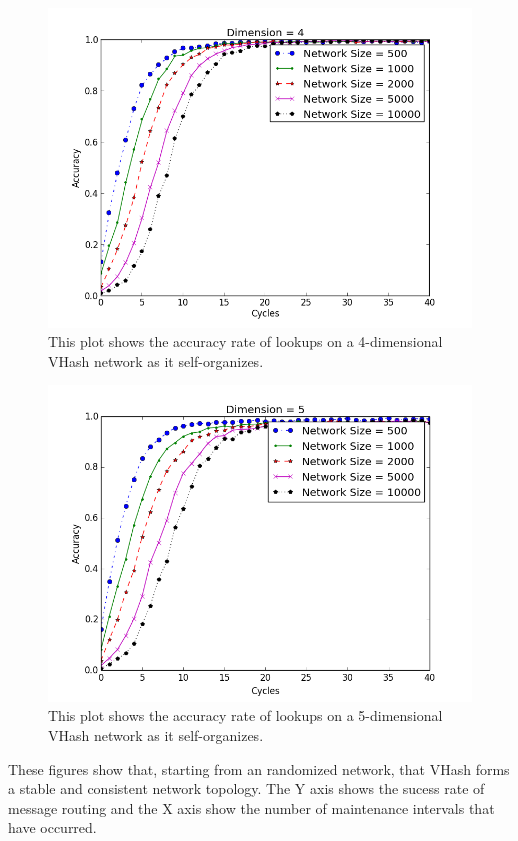 \documentclass[10pt, conference, letterpaper]{IEEEtran}
\begin{document}
{\begin{figure}
	\centering
	\includegraphics[width=\linewidth]{conv_d4}
	\caption{}
		\caption{This plot shows the accuracy rate of lookups on a 4-dimensional VHash network as it self-organizes.}
\end{figure}


\begin{figure}
	\centering
	\includegraphics[width=\linewidth]{conv_d5}
		\caption{This plot shows the accuracy rate of lookups on a 5-dimensional VHash network as it self-organizes.}
	\label{conv5}
\end{figure}
These figures show that, starting from an randomized network, that VHash forms a stable and consistent network topology.
The Y axis shows the sucess rate of message routing and the X axis show the number of maintenance intervals that have occurred.

}
\end{document}
